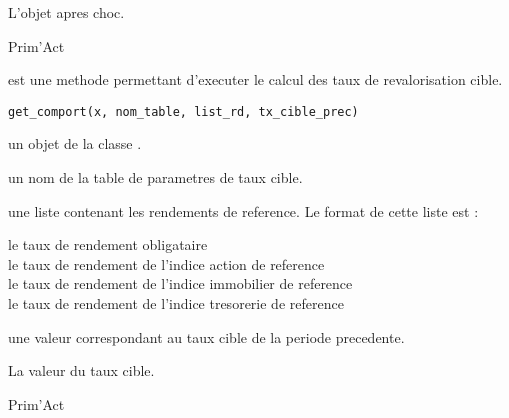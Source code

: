 \documentclass[a4paper]{book}
\begin{document}
%
\begin{Value}
L'objet  apres choc.
\end{Value}
%
\begin{Author}\relax
Prim'Act
\end{Author}
%
\begin{Description}\relax
{} est une methode permettant d'executer le calcul des taux de revalorisation cible.
\end{Description}
%
\begin{Usage}
\begin{verbatim}
get_comport(x, nom_table, list_rd, tx_cible_prec)
\end{verbatim}
\end{Usage}
%
\begin{Arguments}
\begin{ldescription}
\item[\code{x}] un objet de la classe .

\item[\code{nom\_table}] un nom de la table de parametres de taux cible.

\item[\code{list\_rd}] une liste contenant les rendements de reference. Le format de cette liste est :
\begin{description}

\item[le taux de rendement obligataire] 
\item[le taux de rendement de l'indice action de reference] 
\item[le taux de rendement de l'indice immobilier de reference] 
\item[le taux de rendement de l'indice tresorerie de reference] 

\end{description}


\item[\code{tx\_cible\_prec}] une valeur  correspondant au taux cible de la periode precedente.
\end{ldescription}
\end{Arguments}
%
\begin{Value}
La valeur du taux cible.
\end{Value}
%
\begin{Author}\relax
Prim'Act
\end{Author}
\end{document}
